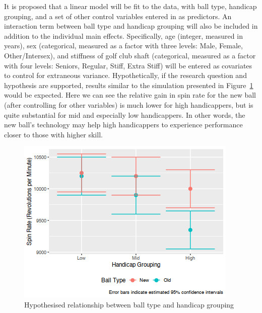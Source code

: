 \documentclass{article}
\begin{document}
It is proposed that a linear model will be fit to the data, with ball type, handicap grouping, and a set of other control variables entered in as predictors. 
An interaction term between ball type and handicap grouping will also be included in addition to the individual main effects. 
Specifically, age (integer, measured in years), sex (categorical, measured as a factor with three levels: Male, Female, Other/Intersex), and stiffness of golf club shaft (categorical, measured as a factor with four levels: Seniors, Regular, Stiff, Extra Stiff) will be entered as covariates to control for extraneous variance. 
Hypothetically, if the research question and hypothesis are supported, results similar to the simulation presented in Figure~\ref{fig:expectations} would be expected.
Here we can see the relative gain in spin rate for the new ball (after controlling for other variables) is much lower for high handicappers, but is quite substantial for mid and especially low handicappers. 
In other words, the new ball's technology may help high handicappers to experience performance closer to those with higher skill.

\begin{figure}[t!]
    \centering
    \includegraphics[max width=\linewidth]{expectations}
    \caption{\label{fig:expectations}Hypothesised relationship between ball type and handicap grouping}
\end{figure}
\end{document}
